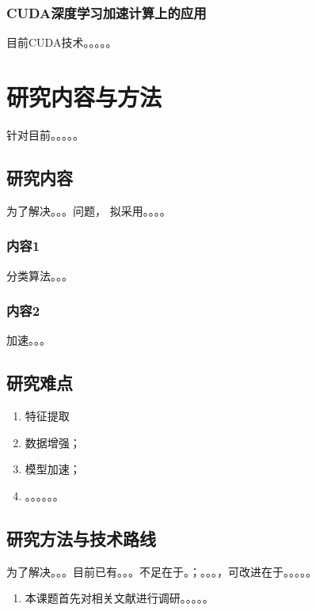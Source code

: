 \documentclass[UTF8,a4paper,11pt]{ctexart}
\begin{document}
\begin{sloppypar}
	
	\subsubsection{CUDA深度学习加速计算上的应用}
	目前CUDA技术。。。。。
	
	\section{研究内容与方法}
	针对目前。。。。。
	
	
	\subsection{研究内容} 
	为了解决。。。问题， 拟采用。。。。
	
	
	\subsubsection{内容1}
	分类算法。。。
	
	\subsubsection{内容2}
	加速。。。
	
	\subsection{研究难点}
	\begin{enumerate}
		\item 特征提取
		\item 数据增强；
		\item 模型加速；
		\item 。。。。。。
	\end{enumerate}
	\subsection{研究方法与技术路线}
	为了解决。。。目前已有。。。不足在于。；。。。，可改进在于。。。。。
	
	
	\begin{enumerate}
		\item 本课题首先对相关文献进行调研。。。。。
		

\end{enumerate}
\end{sloppypar}
\end{document}

